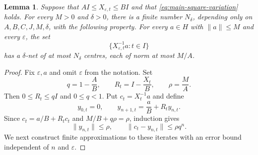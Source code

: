 \documentclass[10pt,a4paper]{amsart}
\newtheorem{lemma}{Lemma}[section]
\newcommand\norm[1]{\|#1\|}
\newcommand\1{\mathbbm{1}}
\newcommand{\eps}{\varepsilon}
\begin{document}
\begin{lemma}\label{lem:main-inverse-cover}
Suppose that $AI\le X_{\eps,t}\le BI$ and that
\eqref{eq:main-square-variation} holds. For every $M>0$ and $\delta>0$,
there is a finite number $N_\delta$, depending only on $A,B,C,J,M,\delta$,
with the following property. For every $a\in H$ with $\norm{a}\le M$ and
every $\eps$, the set
\begin{equation*}
    \{X_{\eps,t}^{-1}a:t\in I\}
\end{equation*}
has a $\delta$-net of at most $N_\delta$ centres, each of norm at most $M/A$.
\end{lemma}
\begin{proof}
Fix $\eps,a$ and omit $\eps$ from the notation. Set
\begin{equation*}
    q=1-\frac AB,\qquad R_t=I-\frac{X_t}{B},
    \qquad \rho=\frac MA.
\end{equation*}
Then $0\le R_t\le qI$ and $0\le q<1$. Put $c_t=X_t^{-1}a$ and define
\begin{equation}\label{eq:main-iteration}
    y_{0,t}=0,\qquad y_{n+1,t}=\frac aB+R_ty_{n,t}.
\end{equation}
Since $c_t=a/B+R_tc_t$ and $M/B+q\rho=\rho$, induction gives
\begin{equation}\label{eq:main-iteration-error}
    \norm{y_{n,t}}\le\rho,
    \qquad\norm{c_t-y_{n,t}}\le\rho q^n.
\end{equation}
We next construct finite approximations to these iterates with an error bound
independent of $n$ and $\eps$.


\end{proof}
\end{document}
